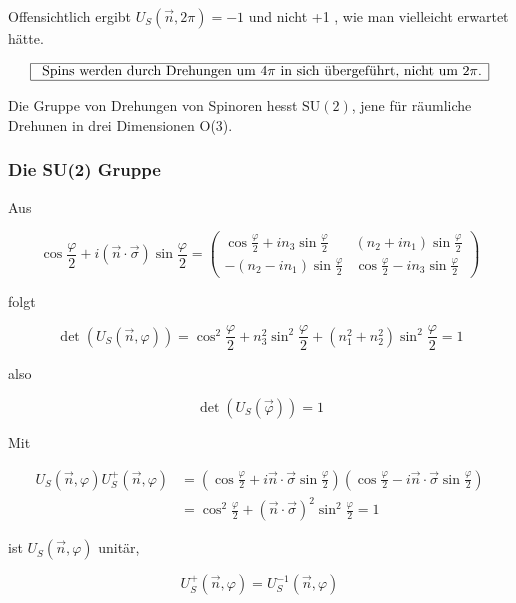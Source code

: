 \documentclass[10pt, letterpaper]{article}
\begin{document}
Offensichtlich ergibt $U_{S}(\vec{n}, 2 \pi)=-1$ und nicht +1 , wie man vielleicht erwartet hätte.

$$
\begin{array}{|l|}
\hline \text { Spins werden durch Drehungen um } 4 \pi \text { in sich übergeführt, nicht um } 2 \pi . \\
\hline
\end{array}
$$

Die Gruppe von Drehungen von Spinoren hesst $\mathrm{SU}(2)$, jene für räumliche Drehunen in drei Dimensionen O(3).










\subsubsection*{Die SU(2) Gruppe}
Aus

$$
\cos \frac{\varphi}{2}+i(\vec{n} \cdot \vec{\sigma}) \sin \frac{\varphi}{2}=\left(\begin{array}{cc}
\cos \frac{\varphi}{2}+i n_{3} \sin \frac{\varphi}{2} & \left(n_{2}+i n_{1}\right) \sin \frac{\varphi}{2} \\
-\left(n_{2}-i n_{1}\right) \sin \frac{\varphi}{2} & \cos \frac{\varphi}{2}-i n_{3} \sin \frac{\varphi}{2}
\end{array}\right)
$$

folgt

$$
\operatorname{det}\left(U_{S}(\vec{n}, \varphi)\right)=\cos ^{2} \frac{\varphi}{2}+n_{3}^{2} \sin ^{2} \frac{\varphi}{2}+\left(n_{1}^{2}+n_{2}^{2}\right) \sin ^{2} \frac{\varphi}{2}=1
$$

also

$$
\operatorname{det}\left(U_{S}(\vec{\varphi})\right)=1
$$

Mit

$$
\begin{aligned}
U_{S}(\vec{n}, \varphi) U_{S}^{+}(\vec{n}, \varphi) & =\left(\cos \frac{\varphi}{2}+i \vec{n} \cdot \vec{\sigma} \sin \frac{\varphi}{2}\right)\left(\cos \frac{\varphi}{2}-i \vec{n} \cdot \vec{\sigma} \sin \frac{\varphi}{2}\right) \\
& =\cos ^{2} \frac{\varphi}{2}+(\vec{n} \cdot \vec{\sigma})^{2} \sin ^{2} \frac{\varphi}{2}=1
\end{aligned}
$$

ist $U_{S}(\vec{n}, \varphi)$ unitär,

$$
U_{S}^{+}(\vec{n}, \varphi)=U_{S}^{-1}(\vec{n}, \varphi)
$$
\end{document}
